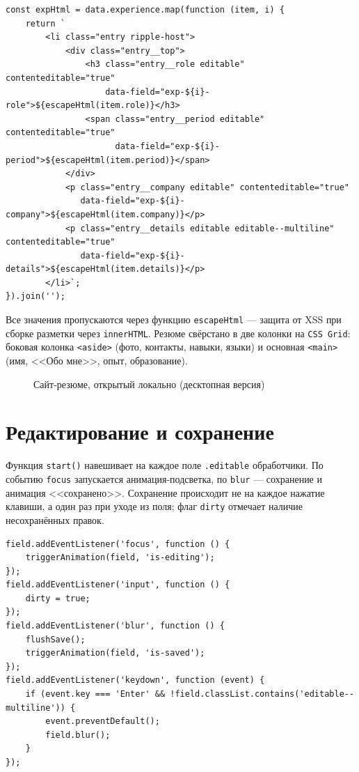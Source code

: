 \begin{lstlisting}[caption={Рендер записей опыта работы (фрагмент \texttt{resume.js})},captionpos=b]
const expHtml = data.experience.map(function (item, i) {
    return `
        <li class="entry ripple-host">
            <div class="entry__top">
                <h3 class="entry__role editable" contenteditable="true"
                    data-field="exp-${i}-role">${escapeHtml(item.role)}</h3>
                <span class="entry__period editable" contenteditable="true"
                      data-field="exp-${i}-period">${escapeHtml(item.period)}</span>
            </div>
            <p class="entry__company editable" contenteditable="true"
               data-field="exp-${i}-company">${escapeHtml(item.company)}</p>
            <p class="entry__details editable editable--multiline" contenteditable="true"
               data-field="exp-${i}-details">${escapeHtml(item.details)}</p>
        </li>`;
}).join('');
\end{lstlisting}

Все значения пропускаются через функцию \texttt{escapeHtml} --- защита от XSS
при сборке разметки через \texttt{innerHTML}. Резюме свёрстано в две колонки
на \texttt{CSS~Grid}: боковая колонка \texttt{<aside>} (фото, контакты,
навыки, языки) и основная \texttt{<main>} (имя, <<Обо мне>>, опыт,
образование).

\begin{figure}[h]
  \centering
  \caption{Сайт-резюме, открытый локально (десктопная версия)}
  \label{fig:resume_desktop}
\end{figure}

\section{Редактирование и сохранение}

Функция \texttt{start()} навешивает на каждое поле \texttt{.editable}
обработчики. По событию \texttt{focus} запускается анимация-подсветка, по
\texttt{blur} --- сохранение и анимация <<сохранено>>. Сохранение происходит
не на каждое нажатие клавиши, а один раз при уходе из поля; флаг
\texttt{dirty} отмечает наличие несохранённых правок.

\begin{lstlisting}[caption={Обработчики редактируемого поля (\texttt{start.js})},captionpos=b]
field.addEventListener('focus', function () {
    triggerAnimation(field, 'is-editing');
});
field.addEventListener('input', function () {
    dirty = true;
});
field.addEventListener('blur', function () {
    flushSave();
    triggerAnimation(field, 'is-saved');
});
field.addEventListener('keydown', function (event) {
    if (event.key === 'Enter' && !field.classList.contains('editable--multiline')) {
        event.preventDefault();
        field.blur();
    }
});
\end{lstlisting}

